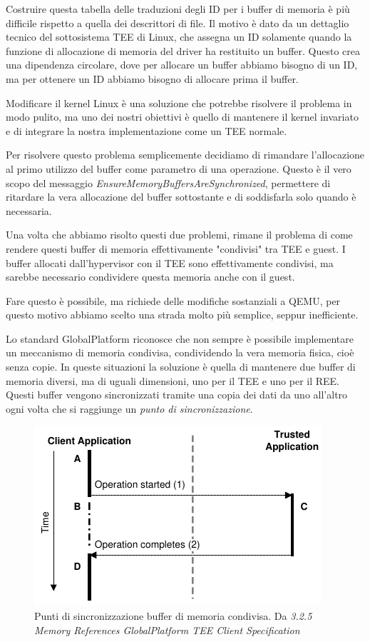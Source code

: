 \documentclass[12pt,italian]{report}
\begin{document}
Costruire questa tabella delle traduzioni degli ID per i buffer di memoria è
più difficile rispetto a quella dei descrittori di file.
Il motivo è dato da un dettaglio tecnico del sottosistema TEE di Linux, che
assegna un ID solamente quando la funzione di allocazione di memoria del driver
ha restituito un buffer.
Questo crea una dipendenza circolare, dove per allocare un buffer
abbiamo bisogno di un ID, ma per ottenere un ID abbiamo bisogno di
allocare prima il buffer.

Modificare il kernel Linux è una soluzione che potrebbe risolvere il problema
in modo pulito, ma uno dei nostri obiettivi è quello di mantenere il kernel
invariato e di integrare la nostra implementazione come un TEE normale. 

Per risolvere questo problema semplicemente decidiamo di rimandare
l'allocazione
al primo utilizzo del buffer come parametro di una operazione.
Questo è il vero scopo del messaggio
\textit{EnsureMemoryBuffersAreSynchronized},
permettere di ritardare la vera allocazione del buffer sottostante e
di soddisfarla solo quando è necessaria.

\bigbreak \noindent

Una volta che abbiamo risolto questi due problemi, rimane il problema di
come rendere questi buffer di memoria effettivamente "condivisi" tra TEE
e guest.
I buffer allocati dall'hypervisor con il TEE sono effettivamente condivisi,
ma sarebbe necessario condividere questa memoria anche con il guest.

Fare questo è possibile, ma richiede delle modifiche sostanziali a QEMU, per
questo motivo abbiamo scelto una strada molto più semplice, seppur
inefficiente.

Lo standard GlobalPlatform riconosce che non sempre è possibile implementare
un meccanismo di memoria condivisa, condividendo la vera memoria fisica,
cioè senza copie.
In queste situazioni la soluzione è quella di mantenere due buffer di memoria
diversi, ma di uguali dimensioni, uno per il TEE e uno per il REE.
Questi buffer vengono sincronizzati tramite una copia dei dati da uno all'altro
ogni volta che si raggiunge un \textit{punto di sincronizzazione}.

\begin{figure}[h]
    \centering
    \includegraphics{immagini/tp-synchronization-points}
    \caption{
        Punti di sincronizzazione buffer di memoria condivisa.
        Da \textit{
            3.2.5 Memory References GlobalPlatform TEE Client Specification
        }
    }
    \label{fig:gp-punti-sincronizzazione}
\end{figure}
\end{document}

